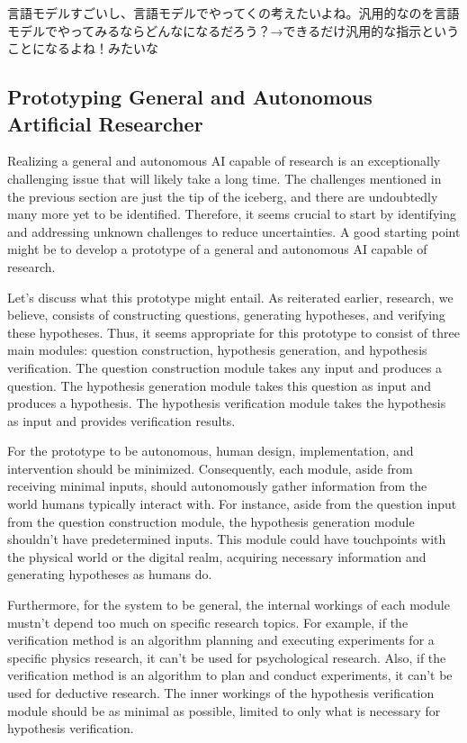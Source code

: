 言語モデルすごいし、言語モデルでやってくの考えたいよね。汎用的なのを言語モデルでやってみるならどんなになるだろう？→できるだけ汎用的な指示ということになるよね！みたいな

\subsection{Prototyping General and Autonomous Artificial Researcher}

Realizing a general and autonomous AI capable of research is an exceptionally challenging issue that will likely take a long time. The challenges mentioned in the previous section are just the tip of the iceberg, and there are undoubtedly many more yet to be identified. Therefore, it seems crucial to start by identifying and addressing unknown challenges to reduce uncertainties. A good starting point might be to develop a prototype of a general and autonomous AI capable of research.

Let's discuss what this prototype might entail. As reiterated earlier, research, we believe, consists of constructing questions, generating hypotheses, and verifying these hypotheses. Thus, it seems appropriate for this prototype to consist of three main modules: question construction, hypothesis generation, and hypothesis verification. The question construction module takes any input and produces a question. The hypothesis generation module takes this question as input and produces a hypothesis. The hypothesis verification module takes the hypothesis as input and provides verification results.

For the prototype to be autonomous, human design, implementation, and intervention should be minimized. Consequently, each module, aside from receiving minimal inputs, should autonomously gather information from the world humans typically interact with. For instance, aside from the question input from the question construction module, the hypothesis generation module shouldn't have predetermined inputs. This module could have touchpoints with the physical world or the digital realm, acquiring necessary information and generating hypotheses as humans do.

Furthermore, for the system to be general, the internal workings of each module mustn't depend too much on specific research topics. For example, if the verification method is an algorithm planning and executing experiments for a specific physics research, it can't be used for psychological research. Also, if the verification method is an algorithm to plan and conduct experiments, it can't be used for deductive research. The inner workings of the hypothesis verification module should be as minimal as possible, limited to only what is necessary for hypothesis verification. 

